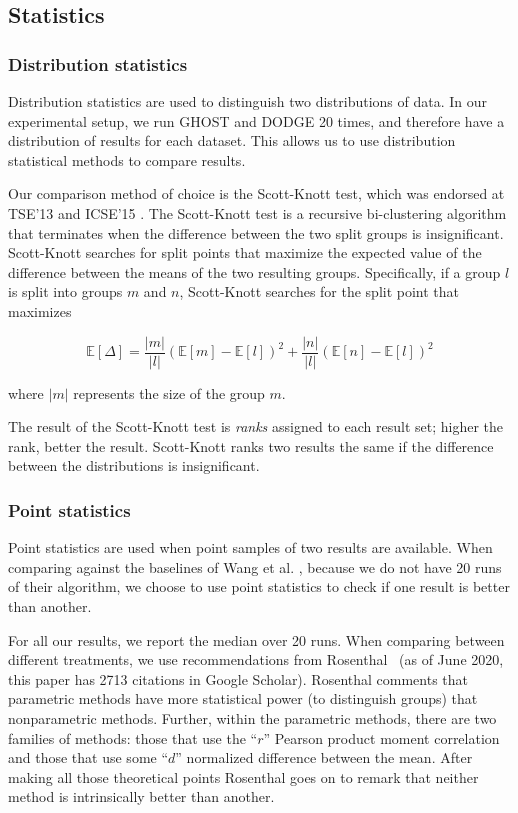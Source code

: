 \documentclass[10pt,compsoc,twocolumn]{IEEEtran}
\begin{document}
\subsection{Statistics}
\label{sec:stats}

\subsubsection{Distribution statistics}

Distribution statistics \cite{arcuri13parameterto, ghotra2015revisiting} are used to distinguish two distributions of data. In our experimental setup, we run GHOST and DODGE 20 times, and therefore have a distribution of results for each dataset. This allows us to use distribution statistical methods to compare results.

Our comparison method of choice is the Scott-Knott test, which was endorsed at TSE'13 \cite{mittas2012ranking} and ICSE'15 \cite{ghotra2015revisiting}. The Scott-Knott test is a recursive bi-clustering algorithm that terminates when the difference between the two split groups is insignificant. Scott-Knott searches for split points that maximize the expected value of the difference between the means of the two resulting groups. Specifically, if a group $l$ is split into groups $m$ and $n$, Scott-Knott searches for the split point that maximizes

\[
    \mathbb{E}[\Delta] = \frac{|m|}{|l|}\left( \mathbb{E}[m] - \mathbb{E}[l] \right)^2 + \frac{|n|}{|l|}\left( \mathbb{E}[n] - \mathbb{E}[l] \right)^2
\]

where $|m|$ represents the size of the group $m$.

The result of the Scott-Knott test is \textit{ranks} assigned to each result set; higher the rank, better the result. Scott-Knott ranks two results the same if the difference between the distributions is insignificant.

\subsubsection{Point statistics}

Point statistics are used when point samples of two results are available. When comparing against the baselines of Wang et al. \cite{wang2016automatically}, because we do not have 20 runs of their algorithm, we choose to use point statistics to check if one result is better than another.

For all our results, we report the median over 20 runs. When comparing between different treatments, we use recommendations from
Rosenthal~\cite{rosenthal1994parametric}
(as of June 2020,  this paper has 2713  citations in Google Scholar).  Rosenthal comments that
  parametric methods have more statistical power (to distinguish groups) that nonparametric methods. Further, within the parametric methods, there are two families of methods: 
  those that use the
  ``$r$''  Pearson product moment correlation and
  those that use some ``$d$'' normalized difference between the mean.
  After making all those theoretical points Rosenthal goes on to remark that  neither method is intrinsically better than another.
  
\end{document}
